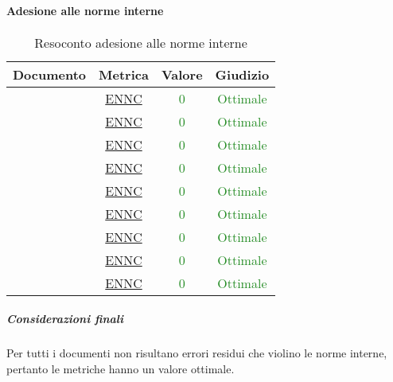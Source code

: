 	\paragraph{Adesione alle norme interne}
		\begin{table}[H]
			\centering
			\small
			\begin{tabular}{c | c | c | c}
				\hline
				\textbf{Documento} & \textbf{Metrica} & \textbf{Valore} & \textbf{Giudizio} \\
				\hline
					\pdpvdue     & \hyperref[MLEC]{ENNC}& \textcolor{ForestGreen}{0} & \textcolor{ForestGreen}{Ottimale} \\
					\pdqvdue     & \hyperref[MLEC]{ENNC}& \textcolor{ForestGreen}{0} & \textcolor{ForestGreen}{Ottimale} \\
					\ndpvdue     & \hyperref[MLEC]{ENNC} & \textcolor{ForestGreen}{0} & \textcolor{ForestGreen}{Ottimale} \\
					\adrvdue     & \hyperref[MLEC]{ENNC} & \textcolor{ForestGreen}{0} & \textcolor{ForestGreen}{Ottimale} \\
					\stvuno		& \hyperref[MLEC]{ENNC} & \textcolor{ForestGreen}{0} & \textcolor{ForestGreen}{Ottimale} \\
					\glvdue     & \hyperref[MLEC]{ENNC} & \textcolor{ForestGreen}{0} & \textcolor{ForestGreen}{Ottimale} \\
					\vcinquei       & \hyperref[MLEC]{ENNC} & \textcolor{ForestGreen}{0} & \textcolor{ForestGreen}{Ottimale} \\
					\vseii       & \hyperref[MLEC]{ENNC}& \textcolor{ForestGreen}{0} & \textcolor{ForestGreen}{Ottimale} \\
					\vtree       & \hyperref[MLEC]{ENNC} & \textcolor{ForestGreen}{0} & \textcolor{ForestGreen}{Ottimale} \\
				\hline
			\end{tabular}
			\caption{Resoconto adesione alle norme interne}
			\label{tab_resoconto_adesione_alle_norme_interne2}
		\end{table}
	
		\subparagraph{Considerazioni finali}
			Per tutti i documenti non risultano errori residui che violino le norme interne, pertanto le metriche hanno un valore ottimale.
		
		
